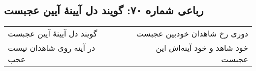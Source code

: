 \begin{center}
\section*{رباعی شماره ۷۰: گویند دل آیینهٔ آیین عجبست}
\label{sec:sh070}
\begin{longtable}{l p{0.5cm} r}
گویند دل آیینهٔ آیین عجبست
&&
دوری رخ شاهدان خودبین عجبست
\\
در آینه روی شاهدان نیست عجب
&&
خود شاهد و خود آینه‌اش این عجبست
\\
\end{longtable}
\end{center}
